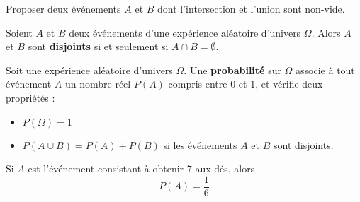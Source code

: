 \documentclass{article}
\begin{document}
\begin{center}
\end{center}
\begin{example}
Proposer deux événements $A$ et $B$ dont l'intersection et l'union sont non-vide.

\emptybox{2cm}
\end{example}
\newpage
\begin{definition}
Soient $A$ et $B$ deux événements d'une expérience aléatoire d'univers $\Omega$. Alors $A$ et $B$ sont \textbf{disjoints} si et seulement si $A \cap B = \emptyset$.
\end{definition}
\begin{definition}
Soit une expérience aléatoire d'univers $\Omega$. Une \textbf{probabilité} sur $\Omega$ associe à tout événement $A$ un nombre réel $P(A)$ compris entre $0$ et $1$, et vérifie deux propriétés :
\begin{itemize}
\item $P(\Omega) = 1$
\item $P(A \cup B) = P(A) + P(B)$ si les événements $A$ et $B$ sont disjoints.
\end{itemize}
\end{definition}
\begin{example}
Si $A$ est l'événement consistant à obtenir $7$ aux dés, alors
\begin{equation*}
P(A) = \dfrac{1}{6}
\end{equation*}
\end{example}
\end{document}
